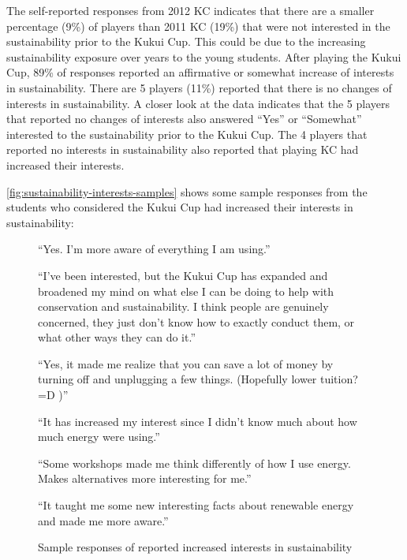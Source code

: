 The self-reported responses from 2012 KC indicates that there are a smaller percentage (9\%) of players than 2011 KC (19\%) that were not interested in the sustainability prior to the Kukui Cup. This could be due to the increasing sustainability exposure over years to the young students.  After playing the Kukui Cup, 89\% of responses reported an affirmative or somewhat increase of interests in sustainability. There are 5 players (11\%)  reported that there is no changes of interests in sustainability. A closer look at the data indicates that the 5 players that reported no changes of interests also answered ``Yes'' or ``Somewhat'' interested to the sustainability prior to the Kukui Cup. The 4 players that reported no interests in sustainability also reported that playing KC had increased their interests.

\autoref{fig:sustainability-interests-samples} shows some sample responses from the students who considered the Kukui Cup had increased their interests in sustainability:
 
 \begin{figure}[ht!]
\begin{mybox}
\begin{compactenum}
	\item ``Yes. I'm more aware of everything I am using.''
	\item ``I've been interested, but the Kukui Cup has expanded and broadened my mind on what else I can be doing to help with conservation and sustainability. I think people are genuinely concerned, they just don't know how to exactly conduct them, or what other ways they can do it.''
	\item ``Yes, it made me realize that you can save a lot of money by turning off and unplugging a few things. (Hopefully lower tuition? =D )''
	\item ``It has increased my interest since I didn't know much about how much energy were using.''
	\item ``Some workshops made me think differently of how I use energy. Makes alternatives more interesting for me.''
	\item ``It taught me some new interesting facts about renewable energy and made me more aware.''	
\end{compactenum}
\end{mybox}
\caption{Sample responses of reported increased interests in sustainability}
\label{fig:sustainability-interests-samples}  
\end{figure}

